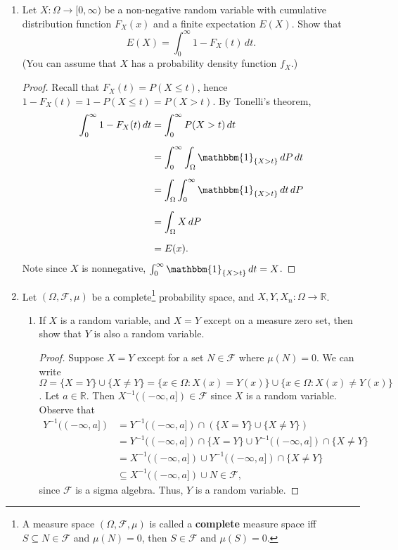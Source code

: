 \documentclass[11pt,oneside,english]{amsart}
\theoremstyle{definition}
\newcommand{\MC}[1]{\mathcal{#1}}
\newcommand{\MB}[1]{\mathbb{#1}}
\newcommand{\1}{\mathbbm{1}}
\begin{document}
\begin{enumerate}[leftmargin=*]
\pagebreak

\item Let $X:\Omega\to[0,\infty)$ be a non-negative random variable with cumulative distribution function $F_X(x)$ and a finite expectation $E(X)$. Show that 
\[
E(X)=\int_0^\infty1-F_X(t)\,dt.
\]
(You can assume that  $X$ has a probability  density function $f_X$.)

\begin{proof}
Recall that $F_X(t)=P(X\leq t)$, hence $1-F_X(t)=1-P(X\leq t)=P(X>t)$. By Tonelli's theorem,  
\begin{align*}
\int_0^\infty1-F_X(t)\,dt&=\int_0^\infty P(X>t)\,dt\\[2mm]
&=\int_0^\infty\int_\Omega\1_{\{X>t\}}\,dP\,dt\\[2mm]
&=\int_\Omega\int_0^\infty\1_{\{X>t\}}\,dt\,dP\\[2mm]
&=\int_\Omega X\,dP\\[2mm]
&=E(x).
\end{align*}
Note since $X$ is nonnegative, $\int_0^\infty\1_{\{X>t\}}\,dt=X$.
\end{proof}


\pagebreak


\item Let $(\Omega, \MC{F},\mu)$ be a complete\footnote{A measure space $(\Omega,\MC{F},\mu)$ is called a \textbf{complete} measure space iff $S\subseteq N\in \MC{F}$ and $\mu(N)=0$, then $S\in\MC{F}$ and $\mu(S)=0$.} probability space, and $X,Y,X_n:\Omega\to\MB{R}$.
\begin{enumerate}
\itemsep5mm

\item If $X$ is a random variable, and $X=Y$ except on a measure zero set, then show that $Y$ is also a random variable.

\begin{proof}
Suppose $X=Y$ except for a set $N\in\MC{F}$ where $\mu(N)=0$. We can write $\Omega=\{X=Y\}\cup\{X\neq Y\}=\{x\in\Omega:X(x)=Y(x)\}\cup\{x\in\Omega: X(x)\neq Y(x)\}$. Let $a\in\MB{R}$. Then $X^{-1}((-\infty,a])\in\MC{F}$ since $X$ is a random variable. Observe that
\begin{align*}
Y^{-1}((-\infty,a])&=Y^{-1}((-\infty,a])\cap(\{X=Y\}\cup\{X\neq Y\})\\[2mm]
&=Y^{-1}((-\infty,a])\cap\{X=Y\}\cup Y^{-1}((-\infty,a])\cap\{X\neq Y\}\\[2mm]
&=X^{-1}((-\infty,a])\cup Y^{-1}((-\infty,a])\cap\{X\neq Y\}\\[2mm]
&\subseteq X^{-1}((-\infty,a])\cup N\in\MC{F},
\end{align*}
since $\MC{F}$ is a sigma algebra. Thus, $Y$ is a random variable.
\end{proof}




\end{enumerate}
\end{enumerate}
\end{document}
